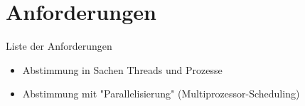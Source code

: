 \section{Anforderungen}
\begin{frame}
	\begin{block}{Liste der Anforderungen}
        \begin{itemize}
        	\item Abstimmung in Sachen Threads und Prozesse
        	\item Abstimmung mit "Parallelisierung" (Multiprozessor-Scheduling)
        \end{itemize}
	\end{block}
\end{frame}

%